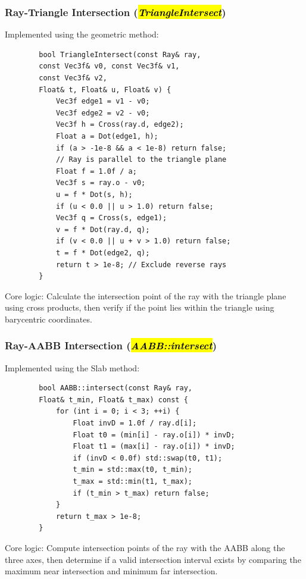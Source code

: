 \documentclass[acmtog]{acmart}
\begin{document}
	\subsubsection{Ray-Triangle Intersection (\hl{\textit{TriangleIntersect}})}
	Implemented using the geometric method:
	\begin{lstlisting}
		bool TriangleIntersect(const Ray& ray, 
		const Vec3f& v0, const Vec3f& v1,
		const Vec3f& v2,
		Float& t, Float& u, Float& v) {
			Vec3f edge1 = v1 - v0;
			Vec3f edge2 = v2 - v0;
			Vec3f h = Cross(ray.d, edge2);
			Float a = Dot(edge1, h);
			if (a > -1e-8 && a < 1e-8) return false; 
			// Ray is parallel to the triangle plane
			Float f = 1.0f / a;
			Vec3f s = ray.o - v0;
			u = f * Dot(s, h);
			if (u < 0.0 || u > 1.0) return false;
			Vec3f q = Cross(s, edge1);
			v = f * Dot(ray.d, q);
			if (v < 0.0 || u + v > 1.0) return false;
			t = f * Dot(edge2, q);
			return t > 1e-8; // Exclude reverse rays
		}
	\end{lstlisting}
	Core logic: Calculate the intersection point of the ray with the triangle plane using cross products, then verify if the point lies within the triangle using barycentric coordinates.
	
	\subsubsection{Ray-AABB Intersection (\hl{\textit{AABB::intersect}})}
	Implemented using the Slab method:
	\begin{lstlisting}
		bool AABB::intersect(const Ray& ray, 
		Float& t_min, Float& t_max) const {
			for (int i = 0; i < 3; ++i) {
				Float invD = 1.0f / ray.d[i];
				Float t0 = (min[i] - ray.o[i]) * invD;
				Float t1 = (max[i] - ray.o[i]) * invD;
				if (invD < 0.0f) std::swap(t0, t1);
				t_min = std::max(t0, t_min);
				t_max = std::min(t1, t_max);
				if (t_min > t_max) return false;
			}
			return t_max > 1e-8;
		}
	\end{lstlisting}
	Core logic: Compute intersection points of the ray with the AABB along the three axes, then determine if a valid intersection interval exists by comparing the maximum near intersection and minimum far intersection.
	
\end{document}
